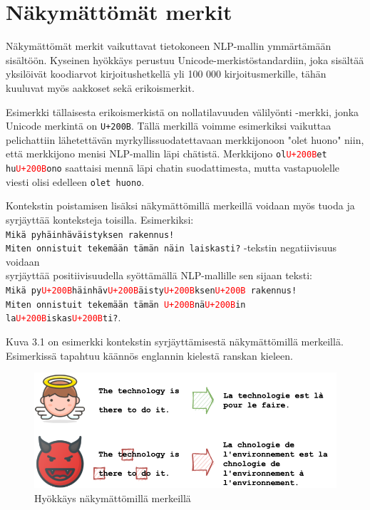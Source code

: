 \section{Näkymättömät merkit}
Näkymättömät merkit vaikuttavat tietokoneen NLP-mallin ymmärtämään sisältöön. Kyseinen hyökkäys perustuu Unicode-merkistöstandardiin, joka sisältää yksilöivät koodiarvot kirjoitushetkellä yli 100 000 kirjoitusmerkille, tähän kuuluvat myös aakkoset sekä erikoismerkit.

Esimerkki tällaisesta erikoismerkistä on nollatilavuuden välilyönti -merkki, jonka Unicode merkintä on \texttt{U+200B}. Tällä merkillä voimme esimerkiksi vaikuttaa pelichattiin lähetettävän myrkyllissuodatettavaan merkkijonoon "olet huono" niin, että merkkijono menisi NLP-mallin läpi chätistä. Merkkijono \texttt{ol\textcolor{red}{U+200B}et hu\textcolor{red}{U+200B}ono} saattaisi mennä läpi chatin suodattimesta, mutta vastapuolelle viesti olisi edelleen \texttt{olet huono}.

Kontekstin poistamisen lisäksi näkymättömillä merkeillä voidaan myös tuoda ja syrjäyttää konteksteja toisilla. Esimerkiksi:\\
\texttt{Mikä pyhäinhäväistyksen rakennus!\\
  Miten onnistuit tekemään tämän näin laiskasti?} -tekstin negatiivisuus voidaan\\
syrjäyttää positiivisuudella syöttämällä NLP-mallille sen sijaan teksti:\\
\texttt{Mikä py\textcolor{red}{U+200B}häinhäv\textcolor{red}{U+200B}äisty\textcolor{red}{U+200B}ksen\textcolor{red}{U+200B} rakennus!\\
  Miten onnistuit tekemään tämän \textcolor{red}{U+200B}nä\textcolor{red}{U+200B}in la\textcolor{red}{U+200B}iskas\textcolor{red}{U+200B}ti?}.

Kuva 3.1 on esimerkki kontekstin syrjäyttämisestä näkymättömillä merkeillä. Esimerkissä tapahtuu käännös englannin kielestä ranskan kieleen.
\begin{figure}[hbt]
  \includegraphics[scale=0.599]{figures/invisible.png}
  \caption{Hyökkäys näkymättömillä merkeillä \citep{boucher2021bad}}
\end{figure}

